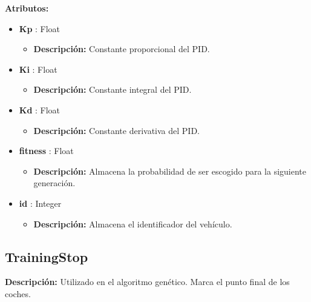 \textbf{Atributos: }
\begin{itemize}
    \item \textbf{Kp} : Float
    \begin{itemize}
        \item \textbf{Descripción: }Constante proporcional del PID.
    \end{itemize}
    
    \item \textbf{Ki} : Float
    \begin{itemize}
        \item \textbf{Descripción: }Constante integral del PID.
    \end{itemize}    

    \item \textbf{Kd} : Float
    \begin{itemize}
        \item \textbf{Descripción: }Constante derivativa del PID.
    \end{itemize}    

    \item \textbf{fitness} : Float
    \begin{itemize}
        \item \textbf{Descripción: }Almacena la probabilidad de ser escogido para la siguiente generación.
    \end{itemize}

    \item \textbf{id} : Integer
    \begin{itemize}
        \item \textbf{Descripción: }Almacena el identificador del vehículo.
    \end{itemize}
\end{itemize}

\subsection{TrainingStop}
\textbf{Descripción: }Utilizado en el algoritmo genético. Marca el punto final de los coches.

\bigskip

